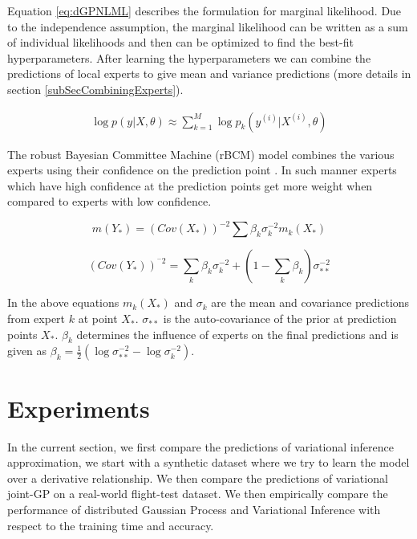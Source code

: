 Equation \ref{eq:dGPNLML} describes the formulation for marginal likelihood. Due to the independence assumption, the marginal likelihood can be written as a sum of individual likelihoods and then can be optimized to find the best-fit hyperparameters. After learning the hyperparameters we can combine the predictions of local experts to give mean and variance predictions (more details in section \ref{subSecCombiningExperts}). 

\begin{align}\label{eq:dGPNLML}
    \log p(y| X, \theta) \approx \sum_{k=1}^{M} \log p_{k}(y^{(i)}| X^{(i)}, \theta)
 \end{align}

The robust Bayesian Committee Machine (rBCM) model combines the various experts using their confidence on the prediction point \cite{deisenroth2015distributed}. In such manner experts which have high confidence at the prediction points get more weight when compared to experts with low confidence. 

\begin{equation}\label{eq:meanDGP}
    m(Y_{*}) = (Cov(X_{*}))^{-2}\sum \beta_{k}\sigma_{k}^{-2}m_{k}(X_{*})
\end{equation}

\begin{equation}
    (Cov(Y_{*}))^{^-2} = \sum_{k} \beta_{k}\sigma_{k}^{-2} + (1- \sum_{k} \beta_{k})\sigma^{-2}_{**}
\end{equation}

In the above equations \(m_{k}(X_{*})\) and \(\sigma_{k}\) are the mean and covariance predictions from expert \(k\) at point \(X_{*}\). \(\sigma_{**}\) is the auto-covariance of the prior at prediction points \(X_{*}\). \(\beta_{k}\) determines the influence of experts on the final predictions \cite{DBLP:journals/corr/CaoF14} and is given as \(\beta_{k} = \frac{1}{2}(\log\sigma_{**}^{-2} - \log\sigma_{k}^{-2})\).  

\section{Experiments}\label{sec:experiments}
In the current section, we first compare the predictions of variational inference approximation, we start with a synthetic dataset where we try to learn the model over a derivative relationship. We then compare the predictions of variational joint-GP on a real-world flight-test dataset. We then empirically compare the performance of distributed Gaussian Process and Variational Inference with respect to the training time and accuracy. 

